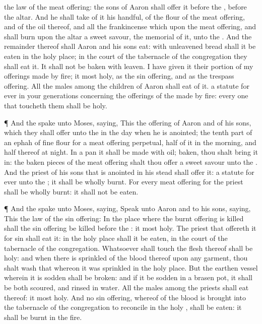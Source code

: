 {{} the
law of the meat
offering: the
sons of
Aaron shall
offer it
before the
{},
before the
altar.
And he shall
take of it his
handful, of the
flour of the meat
offering, and of the
oil thereof, and all the
frankincense which
{} upon the meat
offering, and shall
burn
{} upon the
altar
{} a
sweet
savour,
{} the
memorial of it, unto the
{}.
And the
remainder thereof shall
Aaron and his
sons
eat: with unleavened
bread shall it be
eaten in the
holy
place; in the
court of the
tabernacle of the
congregation they shall
eat it.
It shall not be
baken with
leaven. I have
given it
{} their
portion of my offerings made by
fire; it
{}
most
holy, as
{} the sin
offering, and as the trespass
offering.
All the
males among the
children of
Aaron shall
eat of it.
{} a
statute for
ever in your
generations concerning the
offerings of the
{} made by
fire: every one that
toucheth them shall be
holy.
\par }{\PP {}¶ And the
{}
spake unto
Moses,
saying,
This
{} the
offering of
Aaron and of his
sons, which they shall
offer unto the
{} in the
day when he is
anointed; the tenth
part of an
ephah of fine
flour for a meat
offering
perpetual,
half of it in the
morning, and
half thereof at
night.
In a
pan it shall be
made with
oil;
{}
baken, thou shalt
bring it in:
{} the
baken
pieces of the meat
offering shalt thou
offer
{} a
sweet
savour unto the
{}.
And the
priest of his
sons that is
anointed in his stead shall
offer it:
{} a
statute for
ever unto the
{}; it shall be
wholly
burnt.
For every meat
offering for the
priest shall be wholly
burnt: it shall not be
eaten.
\par }{\PP {}¶ And the
{}
spake unto
Moses,
saying,
Speak unto
Aaron and to his
sons,
saying, This
{} the
law of the sin
offering: In the
place where the burnt
offering is
killed shall the sin
offering be
killed
before the
{}: it
{}
most
holy.
The
priest that offereth it for
sin shall
eat it: in the
holy
place shall it be
eaten, in the
court of the
tabernacle of the
congregation.
Whatsoever shall
touch the
flesh thereof shall be
holy: and when there is
sprinkled of the
blood thereof upon any
garment, thou shalt
wash that whereon it was
sprinkled in the
holy
place.
But the
earthen
vessel wherein it is
sodden shall be
broken: and if it be
sodden in a
brasen
pot, it shall be both
scoured, and
rinsed in
water.
All the
males among the
priests shall
eat thereof: it
{}
most
holy.
And no sin
offering, whereof
{} of the
blood is
brought into the
tabernacle of the
congregation to
reconcile
{} in the
holy
{}, shall be
eaten: it shall be
burnt in the
fire.

}
